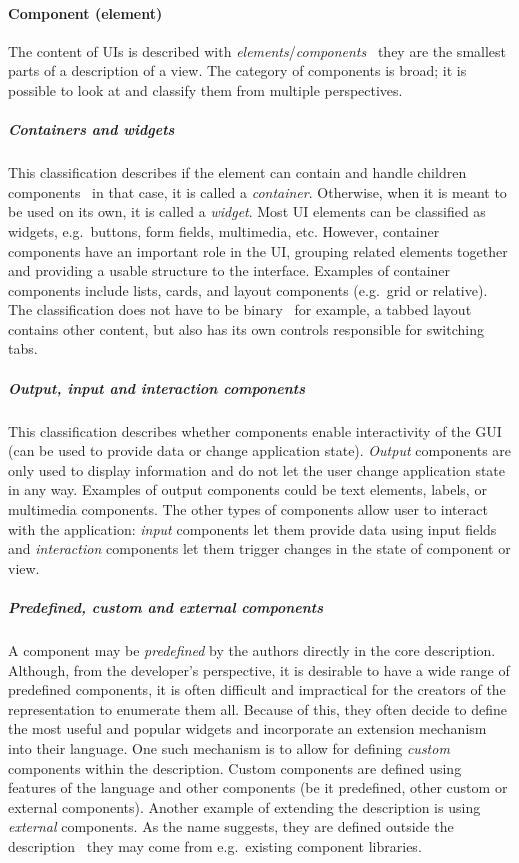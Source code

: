 \paragraph{Component (element)}
The content of UIs is described with \emph{elements}/\emph{components} \textendash\ they are the smallest parts of a description of a view.
The category of components is broad;
it is possible to look at and classify them from multiple perspectives.

\subparagraph{Containers and widgets}
This classification describes if the element can contain and handle children components \textendash\ in that case, it is called a \emph{container}.
Otherwise, when it is meant to be used on its own, it is called a \emph{widget}.
Most UI elements can be classified as widgets, e.g.\ buttons, form fields, multimedia, etc.
However, container components have an important role in the UI, grouping related elements together and providing a usable structure to the interface.
Examples of container components include lists, cards, and layout components (e.g.\ grid or relative).
The classification does not have to be binary \textendash\ for example, a tabbed layout contains other content, but also has its own controls responsible for switching tabs.

\subparagraph{Output, input and interaction components}
This classification describes whether components enable interactivity of the GUI (can be used to provide data or change application state).
\emph{Output} components are only used to display information and do not let the user change application state in any way.
Examples of output components could be text elements, labels, or multimedia components.
The other types of components allow user to interact with the application: \emph{input} components let them provide data using input fields and \emph{interaction} components let them trigger changes in the state of component or view.

\subparagraph{Predefined, custom and external components}
A component may be \emph{predefined} by the authors directly in the core description.
Although, from the developer's perspective, it is desirable to have a wide range of predefined components, it is often difficult and impractical for the creators of the representation to enumerate them all.
Because of this, they often decide to define the most useful and popular widgets and incorporate an extension mechanism into their language.
One such mechanism is to allow for defining \emph{custom} components within the description.
Custom components are defined using features of the language and other components (be it predefined, other custom or external components).
Another example of extending the description is using \emph{external} components.
As the name suggests, they are defined outside the description \textendash\ they may come from e.g.\ existing component libraries.

